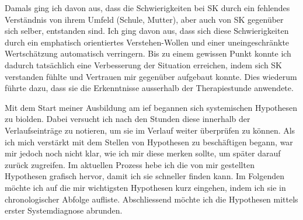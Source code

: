 Damals ging ich davon aus, dass die Schwierigkeiten bei SK durch ein fehlendes Verständnis von ihrem Umfeld (Schule, Mutter), aber auch  von SK gegenüber sich selber, entstanden sind. Ich ging davon aus, dass sich diese Schwierigkeiten durch ein emphatisch orientiertes Verstehen-Wollen und einer uneingeschränkte Wertschätzung automatisch verringern. Bis zu einem gewissen Punkt konnte ich dadurch tatsächlich eine Verbesserung der Situation erreichen, indem sich SK verstanden fühlte und Vertrauen mir gegenüber aufgebaut konnte. Dies wiederum führte dazu, dass sie die Erkenntnisse ausserhalb der Therapiestunde anwendete.

Mit dem Start meiner Ausbildung am \ac{ief} begannen sich systemischen Hypothesen zu biolden. Dabei versucht ich nach den Stunden diese innerhalb der Verlaufseinträge zu notieren, um sie im Verlauf weiter überprüfen zu können. Als ich mich verstärkt mit dem Stellen von Hypothesen zu beschäftigen begann, war mir jedoch noch nicht klar, wie ich mir diese merken sollte, um später darauf zurück zugreifen. Im aktuellen Prozess hebe ich die von mir gestellten Hypothesen grafisch hervor, damit ich sie schneller finden kann. Im Folgenden möchte ich auf die mir wichtigsten Hypothesen kurz eingehen, indem ich sie in chronologischer Abfolge aufliste. Abschliessend möchte ich die Hypothesen mittels erster Systemdiagnose abrunden.

